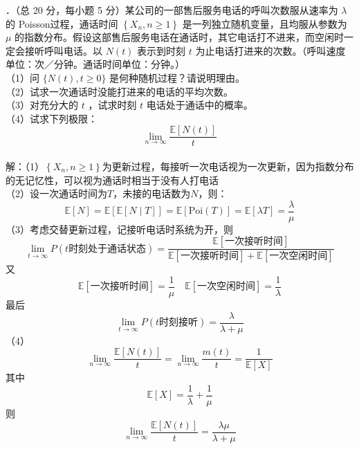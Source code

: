 \documentclass[UTF8]{ctexart}
\begin{document}
．（总 20 分，每小题 5 分）某公司的一部售后服务电话的呼叫次数服从速率为 $\lambda$ 的 Poisson过程，通话时间 $\left\{X_{n}, n \geqslant 1\right\}$ 是一列独立随机变量，且均服从参数为 $\mu$ 的指数分布。假设这部售后服务电话在通话时，其它电话打不进来，而空闲时一定会接听呼叫电话。以 $N(t)$ 表示到时刻 $t$ 为止电话打进来的次数。（呼叫速度单位：次／分钟。通话时间单位：分钟。）\\
（1）问 $\{N(t), t \geqslant 0\}$ 是何种随机过程？请说明理由。\\
（2）试求一次通话时没能打进来的电话的平均次数。\\
（3）对充分大的 $t$ ，试求时刻 $t$ 电话处于通话中的概率。\\
（4）试求下列极限：
$$
\lim _{n \rightarrow \infty} \frac{\mathbb{E}[N(t)]}{t}
$$\\
解：（1）$\left\{X_{n}, n \geqslant 1\right\}$为更新过程，每接听一次电话视为一次更新，因为指数分布的无记忆性，可以视为通话时相当于没有人打电话\\
（2）设一次通话时间为$T$，未接的电话数为$N$，则：
\[
\mathbb{E}[N]=\mathbb{E}\left[\mathbb{E}[N\mid T] \right]=\mathbb{E}[\mathrm{Poi}(T)]=\mathbb{E}\left[\lambda T \right]  =\frac{\lambda}{\mu}
\]
（3）考虑交替更新过程，记接听电话时系统为开，则
\[
\lim_{t\rightarrow \infty}P(t\text{时刻处于通话状态})=\frac{\mathbb{E}\left[\text{一次接听时间} \right] }{\mathbb{E}\left[\text{一次接听时间} \right]+\mathbb{E}\left[\text{一次空闲时间} \right]}
\]
又
\[
\mathbb{E}\left[\text{一次接听时间} \right]=\frac{1}{\mu} \quad \mathbb{E}\left[\text{一次空闲时间}\right] =\frac{1}{\lambda}
\]
最后
\[
\lim_{t\rightarrow \infty}P(t\text{时刻接听})=\frac{\lambda}{\lambda+\mu}
\]
（4）
$$
\lim _{n \rightarrow \infty} \frac{\mathbb{E}[N(t)]}{t}=\lim _{n \rightarrow \infty} \frac{m(t)}{t}=\frac{1}{\mathbb{E}[X]}
$$
其中
\[
\mathbb{E}[X]=\frac{1}{\lambda}+\frac{1}{\mu}
\]
则
\[
\lim _{n \rightarrow \infty} \frac{\mathbb{E}[N(t)]}{t}=\frac{\lambda \mu}{\lambda+\mu}
\]\\
\end{document}
